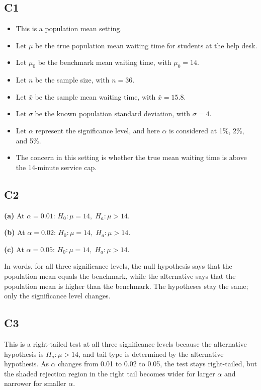 \begin{ExamProblems}
		\subsection*{C1}
		\begin{itemize}
			\item This is a population mean setting.
			\item Let \(\mu\) be the true population mean waiting time for students at the help desk.
			\item Let \(\mu_0\) be the benchmark mean waiting time, with \(\mu_0=14\).
			\item Let \(n\) be the sample size, with \(n=36\).
			\item Let \(\bar{x}\) be the sample mean waiting time, with \(\bar{x}=15.8\).
			\item Let \(\sigma\) be the known population standard deviation, with \(\sigma=4\).
			\item Let \(\alpha\) represent the significance level, and here \(\alpha\) is considered at 1\%, 2\%, and 5\%.
			\item The concern in this setting is whether the true mean waiting time is above the 14-minute service cap.
		\end{itemize}
		
		\subsection*{C2}
		\textbf{(a)} At \(\alpha=0.01\): \(H_0\colon \mu=14,\; H_a\colon \mu>14\).
		
		\textbf{(b)} At \(\alpha=0.02\): \(H_0\colon \mu=14,\; H_a\colon \mu>14\).
		
		\textbf{(c)} At \(\alpha=0.05\): \(H_0\colon \mu=14,\; H_a\colon \mu>14\).
		
		In words, for all three significance levels, the null hypothesis says that the population mean equals the benchmark, while the alternative says that the population mean is higher than the benchmark. The hypotheses stay the same; only the significance level changes.
		
		\subsection*{C3}
		This is a right-tailed test at all three significance levels because the alternative hypothesis is \(H_a\colon \mu>14\), and tail type is determined by the alternative hypothesis. As \(\alpha\) changes from 0.01 to 0.02 to 0.05, the test stays right-tailed, but the shaded rejection region in the right tail becomes wider for larger \(\alpha\) and narrower for smaller \(\alpha\).
		

\end{ExamProblems}
